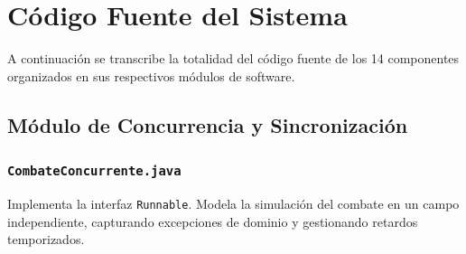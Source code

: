 \documentclass[11pt,letterpaper]{article}
\begin{document}
\section{Código Fuente del Sistema}

A continuación se transcribe la totalidad del código fuente de los 14 componentes organizados en sus respectivos módulos de software.

\subsection{Módulo de Concurrencia y Sincronización}

\subsubsection{\texttt{CombateConcurrente.java}}
Implementa la interfaz \texttt{Runnable}. Modela la simulación del combate en un campo independiente, capturando excepciones de dominio y gestionando retardos temporizados.
\end{document}
